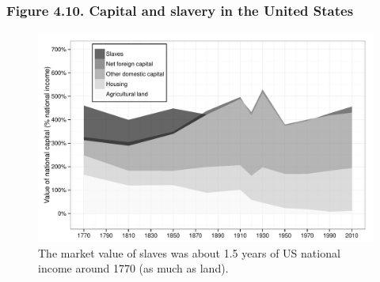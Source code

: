 \documentclass[t]{beamer}\usepackage[]{graphicx}\usepackage[]{color}
\newenvironment{knitrout}{}{} %
\begin{document}
\begin{frame}[label=Figure_4_10]
\frametitle{Figure 4.10. Capital and slavery in the United States}
\begin{figure}[t]
\begin{minipage}[b]{\textwidth}
\centering
\begin{knitrout}\footnotesize
{}\color{fgcolor}

{\centering \includegraphics[width=1\linewidth]{figures/bw/Figure_4_10} 

}



\end{knitrout}
\caption{The market value of slaves was about 1.5 years of US national income around 1770 (as much as land).}
\end{minipage}
\end{figure}
\end{frame}
\end{document}
